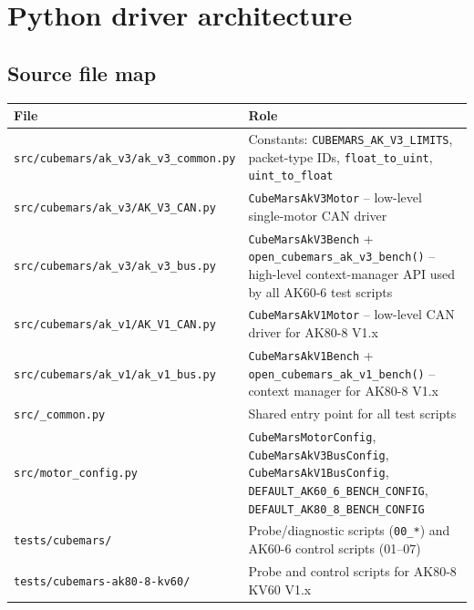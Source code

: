 \documentclass[11pt,a4paper]{article}
\begin{document}
\section{Python driver architecture}
\label{sec:driver}

\subsection{Source file map}

\begin{center}\small
\begin{tabular}{lp{9.5cm}}
\toprule
File & Role \\
\midrule
\texttt{src/cubemars/ak\_v3/ak\_v3\_common.py}
  & Constants: \texttt{CUBEMARS\_AK\_V3\_LIMITS}, packet-type IDs,
    \texttt{float\_to\_uint}, \texttt{uint\_to\_float} \\
\texttt{src/cubemars/ak\_v3/AK\_V3\_CAN.py}
  & \texttt{CubeMarsAkV3Motor} -- low-level single-motor CAN driver \\
\texttt{src/cubemars/ak\_v3/ak\_v3\_bus.py}
  & \texttt{CubeMarsAkV3Bench} + \texttt{open\_cubemars\_ak\_v3\_bench()} --
    high-level context-manager API used by all AK60-6 test scripts \\
\texttt{src/cubemars/ak\_v1/AK\_V1\_CAN.py}
  & \texttt{CubeMarsAkV1Motor} -- low-level CAN driver for AK80-8 V1.x \\
\texttt{src/cubemars/ak\_v1/ak\_v1\_bus.py}
  & \texttt{CubeMarsAkV1Bench} + \texttt{open\_cubemars\_ak\_v1\_bench()} --
    context manager for AK80-8 V1.x \\
\texttt{src/\_common.py}
  & Shared entry point for all test scripts \\
\texttt{src/motor\_config.py}
  & \texttt{CubeMarsMotorConfig}, \texttt{CubeMarsAkV3BusConfig},
    \texttt{CubeMarsAkV1BusConfig},
    \texttt{DEFAULT\_AK60\_6\_BENCH\_CONFIG},
    \texttt{DEFAULT\_AK80\_8\_BENCH\_CONFIG} \\
\texttt{tests/cubemars/}
  & Probe/diagnostic scripts (\texttt{00\_*}) and AK60-6 control scripts (01--07) \\
\texttt{tests/cubemars-ak80-8-kv60/}
  & Probe and control scripts for AK80-8 KV60 V1.x \\
\bottomrule
\end{tabular}
\end{center}
\end{document}
